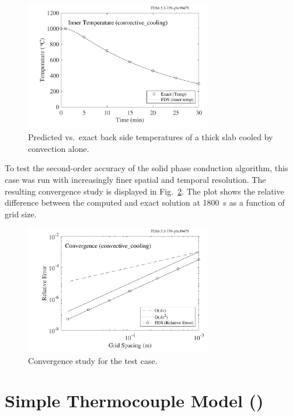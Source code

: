 \documentclass[11pt]{book}
\begin{document}
\begin{figure}[ht]
\centering
\includegraphics[width=3.2in]{SCRIPT_FIGURES/convective_cooling}
\caption[The  test case]{Predicted vs.~exact back side temperatures of a thick slab cooled by convection alone.}
\label{convective_cooling_fig}
\end{figure}

To test the second-order accuracy of the solid phase conduction algorithm, this case was run with increasingly finer spatial and temporal resolution. The resulting convergence study is displayed in Fig.~\ref{convective_cooling_convergence}. The plot shows the relative difference between the computed and exact solution at 1800~s as a function of grid size.

\begin{figure}[ht]
\centering
\includegraphics[width=3.2in]{SCRIPT_FIGURES/convective_cooling_error}
\caption[Convergence study for the  test case]{Convergence study for the  test case.}
\label{convective_cooling_convergence}
\end{figure}


\clearpage

\section{Simple Thermocouple Model (\texorpdfstring{}{thermocouples})}
\label{thermocouples}
\end{document}
